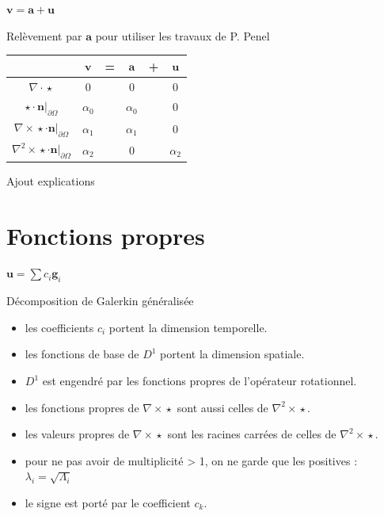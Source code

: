 \documentclass{beamer}
\newcommand{\rot}{{\nabla\times}}
\newcommand{\rott}{{\nabla^2\times}}
\renewcommand{\div}{{\nabla\cdot}}
\newcommand{\restr}{{\big\rvert_{\partial\Omega}}}
\begin{document}
\begin{frame}{$\mathbf{v}=\mathbf{a}+\mathbf{u}$}
\begin{block}{Relèvement par $\mathbf{a}$ pour utiliser les travaux de P. Penel}
\begin{center}
\begin{tabular}{c|ccccc}
& $\mathbf{v}$ & = & $\mathbf{a}$ & + & $\mathbf{u}$ \\ \hline
$\div\star$ & 0 & & 0 & & 0\\ \hline
$\star\cdot \mathbf{n}\restr$ & $\alpha_0$ & & $\alpha_0$ & & 0\\ \hline
$\rot\star\cdot \mathbf{n}\restr$ & $\alpha_1$ & & $\alpha_1$ & & 0\\\hline
$\rott\star\cdot \mathbf{n}\restr$ & $\alpha_2$ & & 0 & & $\alpha_2$ 
\end{tabular}
\end{center}
\end{block}
Ajout explications

\end{frame}

\section{Fonctions propres}
\begin{frame}{$\mathbf{u}=\sum c_i\mathbf{g}_i$}
\begin{block}{Décomposition de Galerkin généralisée}
\begin{itemize}
\item les coefficients $c_i$ portent la dimension temporelle.
\item les fonctions de base de $D^1$ portent la dimension spatiale.
\item $D^1$ est engendré par les fonctions propres de l'opérateur rotationnel.
\item les fonctions propres de $\rot\star$ sont aussi celles de $\rott\star$.
\item les valeurs propres de $\rot\star$ sont les racines carrées de celles de $\rott\star$.
\item pour ne pas avoir de multiplicité > 1, on ne garde que les positives : $\lambda_i=\sqrt{\Lambda_i}$
\item le signe est porté par le coefficient $c_k$.
\end{itemize}
\end{block}
\end{frame}
\end{document}
